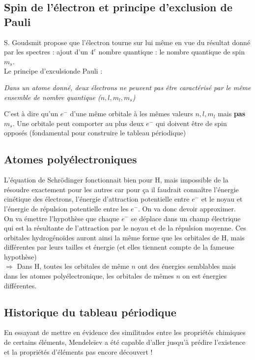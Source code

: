 \documentclass[12pt, a4paper]{article}
\begin{document}
\subsection{Spin de l'électron et principe d'exclusion de Pauli}
S. Goudsmit propose que l'électron tourne sur lui même en vue du résultat donné par les spectres : ajout d'un $4^e$ nombre quantique : le nombre quantique de spin $m_s$.\\
Le principe d'exculsionde Pauli : 
\begin{center}
\textit{Dans un atome donné, deux électrons ne peuvent pas être caractérisé par le même ensemble de nombre quantique ($n, l, m_l, m_s$)}
\end{center}
C'est à dire qu'un $e^-$ d'une même orbitale à les mêmes valeurs $n, l, m_l$ mais \textbf{pas} $m_s$. Une orbitale peut comporter au plus deux $e^-$ qui doivent être de spin opposés (fondamental pour construire le tableau périodique)

\subsection{Atomes polyélectroniques}
L'équation de Schrödinger fonctionnait bien pour H, mais impossible de la résoudre exactement pour les autres car pour ça il faudrait connaître l'énergie cinétique des électrons, l'énergie d'attraction potentielle entre $e^-$ et le noyau et l'énergie de répulsion potentielle entre les $e^-$. On va donc devoir approximer.\\

On va émettre l'hypothèse que chaque $e^-$ se déplace dans un champ électrique qui est la résultante de l'attraction par le noyau et de la répulsion moyenne. Ces orbitales hydrogénoïdes auront ainsi la même forme que les orbitales de H, mais différentes par leurs tailles et énergie (et elles tiennent compte de la fameuse hypothèse)\\

$\Rightarrow$ Dans H, toutes les orbitales de même $n$ ont des énergies semblables mais dans les atomes polyélectronique, les orbitales de mêmes $n$ on est énergies différentes.

\subsection{Historique du tableau périodique}
En essayant de mettre en évidence des similitudes entre les propriétés chimiques de certains éléments, Mendeleïev a été capable d'aller jusqu'à prédire l'existence et la propriétés d'éléments pas encore découvert ! 
\end{document}
